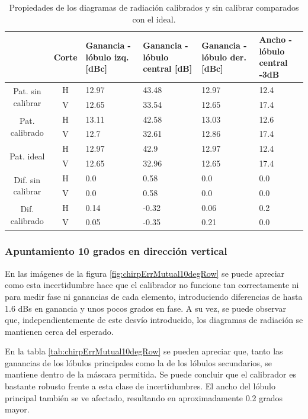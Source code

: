 \begin{table}[H]
  \footnotesize
  \centering
  \begin{tabular}{|c|c|p{2cm}|p{2.5cm}|p{2.5cm}|p{2.5cm}|}
    \cline{2-6}
    \multicolumn{1}{c|}{} & Corte & Ganancia - lóbulo izq. [dBc] & Ganancia - lóbulo central [dB] &
    Ganancia - lóbulo der. [dBc] & Ancho - lóbulo central -3dB \tabularnewline\hline
    \multirow{2}{2cm}{Pat. sin calibrar} & H & 12.97 & 43.48 & 12.97 & 12.4 \tabularnewline\cline{2-6}
     & V & 12.65 & 33.54 & 12.65 & 17.4 \tabularnewline\hline
    \multirow{2}{2cm}{Pat. calibrado} & H & 13.11 & 42.58 & 13.03 & 12.6 \tabularnewline\cline{2-6}
     & V & 12.7 & 32.61 & 12.86 & 17.4 \tabularnewline\hline
    \multirow{2}{2cm}{Pat. ideal} & H & 12.97 & 42.9 & 12.97 & 12.4 \tabularnewline\cline{2-6}
     & V & 12.65 & 32.96 & 12.65 & 17.4 \tabularnewline\hline
    \multirow{2}{2cm}{Dif. sin calibrar} & H & 0.0 & 0.58 & 0.0 & 0.0\tabularnewline\cline{2-6}
     & V & 0.0 & 0.58 & 0.0 & 0.0 \tabularnewline\hline
    \multirow{2}{2cm}{Dif. calibrado} & H & 0.14 & -0.32 & 0.06 & 0.2 \tabularnewline\cline{2-6}
     & V & 0.05 & -0.35 & 0.21 & 0.0 \tabularnewline\hline
  \end{tabular}
  \caption{Propiedades de los diagramas de radiación calibrados y sin calibrar comparados con el ideal.}
  \label{tab:chirpErrMutual10degCol}
\end{table}


\subsubsection{Apuntamiento 10 grados en dirección vertical}

En las imágenes de la figura \ref{fig:chirpErrMutual10degRow} se puede apreciar como esta incertidumbre hace que el calibrador 
no funcione tan correctamente ni para medir fase ni ganancias de cada elemento, introduciendo diferencias de hasta 1.6 dBs en 
ganancia y unos pocos grados en fase. A su vez, se puede observar que, independientemente de este desvío introducido, los diagramas de 
radiación se mantienen cerca del esperado.

En la tabla \ref{tab:chirpErrMutual10degRow} se pueden apreciar que, tanto las ganancias de los lóbulos principales como la de 
los lóbulos secundarios, se mantiene dentro de la máscara permitida. Se puede concluir que el calibrador es bastante robusto 
frente a esta clase de incertidumbres. El ancho del lóbulo principal también se ve afectado, resultando en aproximadamente 0.2
grados mayor.

